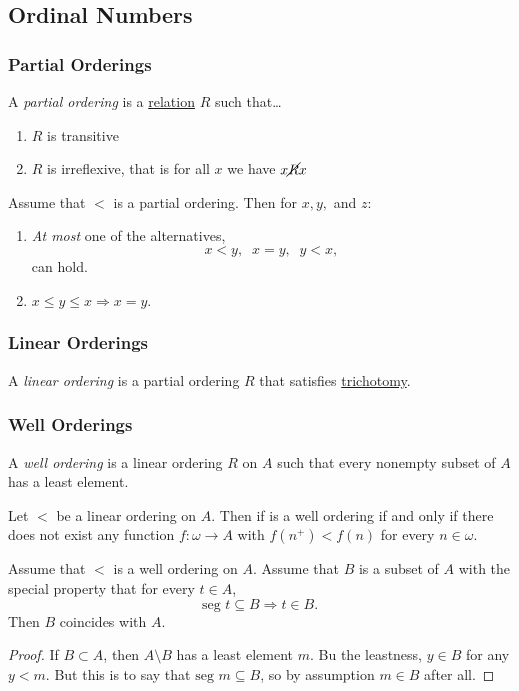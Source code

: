 \subsection{Ordinal Numbers}\label{ordinalnumbers}

\subsubsection{Partial Orderings}\label{partialorderings}
A \emph{partial ordering} is a \hyperref[relation]{relation} $R$ such that\dots
\begin{enumerate}
  \item $R$ is transitive
  \item $R$ is irreflexive, that is for all $x$ we have $x \cancel{R} x$
\end{enumerate}

\begin{proposition}
Assume that $<$ is a partial ordering. Then for $x,y,$ and $z$:
\begin{enumerate}
  \item \emph{At most} one of the alternatives,
  		$$x < y, \; \; x = y, \; \; y < x,$$
  		can hold.
  \item $x \leq y \leq x \Rightarrow x = y.$
\end{enumerate}
\end{proposition}

\subsubsection{Linear Orderings}\label{partialorderings}
A \emph{linear ordering} is a partial ordering $R$ that satisfies \hyperref[trichotomy]{trichotomy}.

\subsubsection{Well Orderings}\label{wellorderings}
A \emph{well ordering} is a linear ordering $R$ on $A$ such that every nonempty subset of $A$ has a least element.

\begin{theorem}
Let $<$ be a linear ordering on $A$. Then if is a well ordering if and only if there does not exist any function $f: \omega \rightarrow A$ with $f(n^+) < f(n)$ for every $n \in \omega$.
\end{theorem}

\begin{theorem}\label{transfiniteinduction}
Assume that $<$ is a well ordering on $A$. Assume that $B$ is a subset of $A$ with the special property that for every $t \in A$,
$$\textrm{seg } t \subseteq B \Rightarrow t \in B.$$
Then $B$ coincides with $A$.
\end{theorem}

\begin{proof}
If $B \subset A$, then $A \setminus B$ has a least element $m$. Bu the leastness, $y \in B$ for any $y < m$. But this is to say that $\textrm{seg } m \subseteq B$, so by assumption $m \in B$ after all.
\end{proof}

